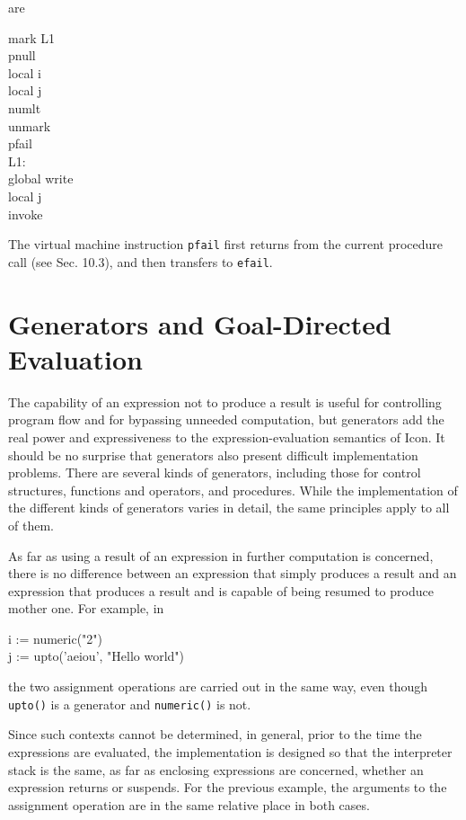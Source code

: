 are

\begin{iconcode}
\>mark\>\>\> L1\\
\>pnull\\
\>local\>\>\> i\\
\>local\>\>\> j\\
\>numlt\\
\>unmark\\
\>pfail\\
L1:\\
\>global\>\>\> write\\
\>local\>\>\> j\\
\>invoke\>\>
\end{iconcode}

The virtual machine instruction \texttt{pfail} first returns from the
current procedure call (see Sec. 10.3), and then transfers to
\texttt{efail}.


\section{Generators and Goal-Directed Evaluation}

The capability of an expression not to produce a result is useful for
controlling program flow and for bypassing unneeded computation, but
generators add the real power and expressiveness to the
expression-evaluation semantics of Icon. It should be no surprise that
generators also present difficult implementation problems. There are
several kinds of generators, including those for control structures,
functions and operators, and procedures. While the implementation of
the different kinds of generators varies in detail, the same
principles apply to all of them.


As far as using a result of an expression in further computation is
concerned, there is no difference between an expression that simply
produces a result and an expression that produces a result and is
capable of being resumed to produce mother one. For example, in

\begin{iconcode}
\>i := numeric("2")\\
\>j := upto('aeiou', "Hello world")
\end{iconcode}

\noindent the two assignment operations are carried out in the same
way, even though \texttt{upto()} is a generator and \texttt{numeric()}
is not.

Since such contexts cannot be determined, in general, prior to the
time the expressions are evaluated, the implementation is designed so
that the interpreter stack is the same, as far as enclosing
expressions are concerned, whether an expression returns or
suspends. For the previous example, the arguments to the assignment
operation are in the same relative place in both cases.

